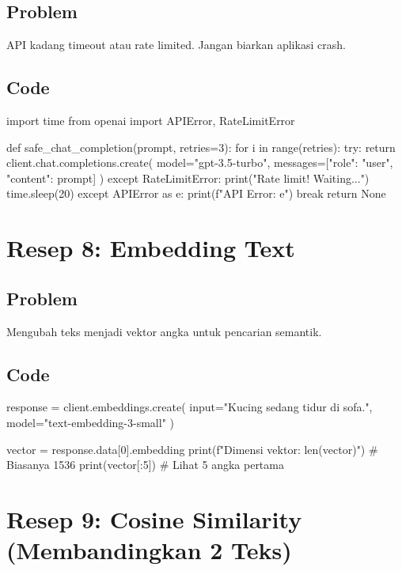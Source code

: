 \subsection*{Problem}
API kadang timeout atau rate limited. Jangan biarkan aplikasi crash.

\subsection*{Code}
\begin{codeblock}[language=Python]
import time
from openai import APIError, RateLimitError

def safe_chat_completion(prompt, retries=3):
    for i in range(retries):
        try:
            return client.chat.completions.create(
                model="gpt-3.5-turbo",
                messages=[{"role": "user", "content": prompt}]
            )
        except RateLimitError:
            print("Rate limit! Waiting...")
            time.sleep(20)
        except APIError as e:
            print(f"API Error: {e}")
            break
    return None
\end{codeblock}

\section{Resep 8: Embedding Text}

\subsection*{Problem}
Mengubah teks menjadi vektor angka untuk pencarian semantik.

\subsection*{Code}
\begin{codeblock}[language=Python]
response = client.embeddings.create(
    input="Kucing sedang tidur di sofa.",
    model="text-embedding-3-small"
)

vector = response.data[0].embedding
print(f"Dimensi vektor: {len(vector)}") # Biasanya 1536
print(vector[:5]) # Lihat 5 angka pertama
\end{codeblock}

\section{Resep 9: Cosine Similarity (Membandingkan 2 Teks)}

